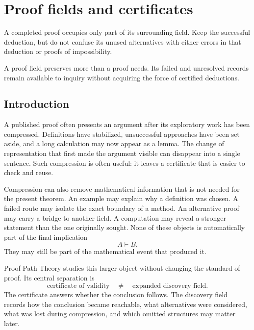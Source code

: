 
\chapter{Proof fields and certificates}\label{PPT:book:chapter-50}
A completed proof occupies only part of its surrounding field. Keep the successful deduction, but do not confuse its unused alternatives with either errors in that deduction or proofs of impossibility.

  \par
  A proof field preserves more than a proof needs. Its failed and unresolved records remain available to inquiry without acquiring the force of certified deductions.
 


\section{Introduction}
\label{PPT:sec:old1}

A published proof often presents an argument after its exploratory work has been compressed. Definitions have stabilized, unsuccessful approaches have been set aside, and a long calculation may now appear as a lemma. The change of representation that first made the argument visible can disappear into a single sentence. Such compression is often useful: it leaves a certificate that is easier to check and reuse.

Compression can also remove mathematical information that is not needed for the present theorem. An example may explain why a definition was chosen. A failed route may isolate the exact boundary of a method. An alternative proof may carry a bridge to another field. A computation may reveal a stronger statement than the one originally sought. None of these objects is automatically part of the final implication
\[
A\vdash B.
\]
They may still be part of the mathematical event that produced it.

Proof Path Theory studies this larger object without changing the standard of proof. Its central separation is
\[
\boxed{
\text{certificate of validity}
\quad\ne\quad
\text{expanded discovery field}.
}
\]
The certificate answers whether the conclusion follows. The discovery field records how the conclusion became reachable, what alternatives were considered, what was lost during compression, and which omitted structures may matter later.

